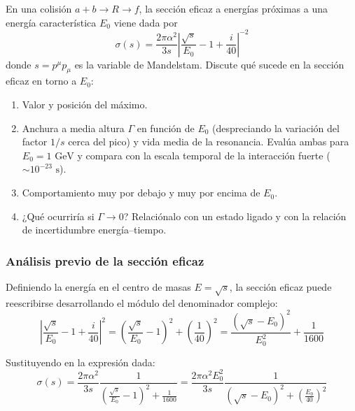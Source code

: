 \newpage
\begin{problema}
En una colisión $a + b \longrightarrow R \longrightarrow f$, la sección eficaz a energías próximas a una energía característica $E_0$ viene dada por
\begin{equation*}
\sigma(s) = \frac{2\pi\alpha^2}{3s} \left| \frac{\sqrt{s}}{E_0} - 1 + \frac{i}{40} \right|^{-2}
\end{equation*}
donde $s = p^\mu p_\mu$ es la variable de Mandelstam. Discute qué sucede en la sección eficaz en torno a $E_0$:

\begin{enumerate}[label=\alph*)]
    \item Valor y posición del máximo.
    \item Anchura a media altura $\Gamma$ en función de $E_0$ (despreciando la variación del factor $1/s$ cerca del pico) y vida media de la resonancia. Evalúa ambas para $E_0 = 1\text{ GeV}$ y compara con la escala temporal de la interacción fuerte ($\sim 10^{-23}\text{ s}$).
    \item Comportamiento muy por debajo y muy por encima de $E_0$.
    \item ¿Qué ocurriría si $\Gamma \to 0$? Relaciónalo con un estado ligado y con la relación de incertidumbre energía--tiempo.
\end{enumerate}

\tcblower

\subsubsection*{Análisis previo de la sección eficaz}

Definiendo la energía en el centro de masas $E = \sqrt{s}$, la sección eficaz puede reescribirse desarrollando el módulo del denominador complejo:
\begin{equation*}
\left| \frac{\sqrt{s}}{E_0} - 1 + \frac{i}{40} \right|^2 = \left( \frac{\sqrt{s}}{E_0} - 1 \right)^2 + \left(\frac{1}{40}\right)^2 = \frac{(\sqrt{s} - E_0)^2}{E_0^2} + \frac{1}{1600}
\end{equation*}

Sustituyendo en la expresión dada:
\begin{equation*}
\sigma(s) = \frac{2\pi\alpha^2}{3s} \frac{1}{\left( \frac{\sqrt{s}}{E_0} - 1 \right)^2 + \frac{1}{1600}} = \frac{2\pi\alpha^2 E_0^2}{3s} \frac{1}{(\sqrt{s} - E_0)^2 + \left(\frac{E_0}{40}\right)^2}
\end{equation*}


\end{problema}
